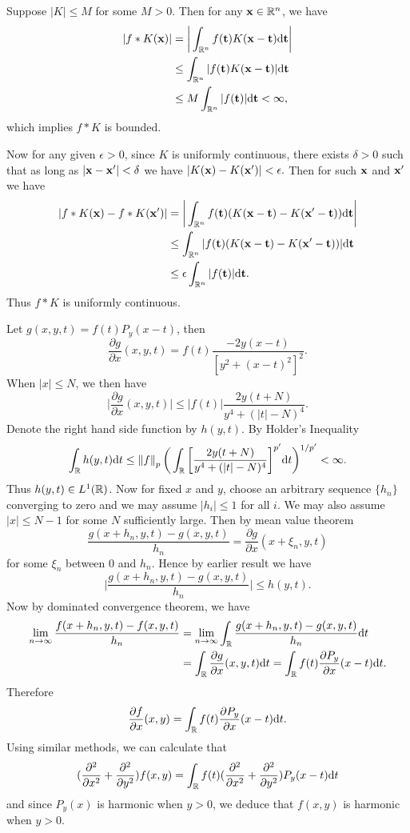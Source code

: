 \begin{exercise}{9.6}
  Suppose $|K|\leq M$ for some $M>0$. Then for any $\mathbf{x}\in\mathbb{R}^n$, we have
  \begin{align*}
      |f*K(\mathbf{x})|&=\bigg|\int_{\mathbb{R}^n}f(\mathbf{t})K(\mathbf{x}-\mathbf{t})\mathrm{d}\mathbf{t}\bigg|\\
      &\leq\int_{\mathbb{R}^n}|f(\mathbf{t})K(\mathbf{x}-\mathbf{t})|\mathrm{d}\mathbf{t}\\
      &\leq M\int_{\mathbb{R}^n}|f(\mathbf{t})|\mathrm{d}\mathbf{t}<\infty,
  \end{align*}
  which implies $f*K$ is bounded.
  
  Now for any given $\epsilon>0$, since $K$ is uniformly continuous, there exists $\delta>0$ such that as long as $|\mathbf{x}-\mathbf{x}'|<\delta$ we have $|K(\mathbf{x})-K(\mathbf{x}')|<\epsilon.$ Then for such $\mathbf{x}$ and $\mathbf{x}'$ we have
  \begin{align*}
      |f*K(\mathbf{x})-f*K(\mathbf{x}')|&=\bigg|\int_{\mathbb{R}^n}f(\mathbf{t})(K(\mathbf{x}-\mathbf{t})-K(\mathbf{x}'-\mathbf{t}))\mathrm{d}\mathbf{t}\bigg|\\
      &\leq \int_{\mathbb{R}^n}|f(\mathbf{t})(K(\mathbf{x}-\mathbf{t})-K(\mathbf{x}'-\mathbf{t}))|\mathrm{d}\mathbf{t}\\
      &\leq \epsilon\int_{\mathbb{R}^n}|f(\mathbf{t})|\mathrm{d}\mathbf{t}.
  \end{align*}
  Thus $f*K$ is uniformly continuous.
\end{exercise}

\begin{exercise}{9.7}
  Let $g(x,y,t)=f(t)P_y(x-t)$, then 
  \[
  \frac{\partial g}{\partial x}(x,y,t)=f(t)\frac{-2y(x-t)}{[y^2+(x-t)^2]^2}.
  \]
  When $|x|\leq N$, we then have 
  \[
    \bigg|\frac{\partial g}{\partial x}(x,y,t)\bigg|\leq |f(t)|\frac{2y(t+N)}{y^4+(|t|-N)^4}.
  \]
  Denote the right hand side function by $h(y,t)$. By Holder's Inequality
  \[
    \int_{\mathbb{R}} h(y,t)\mathrm{d} t\leq \left\|f\right\|_p\bigg(\int_{\mathbb{R}}\bigg[\frac{2y(t+N)}{y^4+(|t|-N)^4}\bigg]^{p'}\mathrm{d} t\bigg)^{1/{p'}}<\infty.
  \]
  Thus $h(y,t)\in L^1(\mathbb{R})$. Now for fixed $x$ and $y$, choose an arbitrary sequence $\{h_n\}$ converging to zero and we may assume $|h_i|\leq 1$ for all $i$. We may also assume $|x|\leq N-1$ for some $N$ sufficiently large. Then by mean value theorem
  \[
    \frac{g(x+h_n,y,t)-g(x,y,t)}{h_n}=\frac{\partial g}{\partial x}(x+\xi_n,y,t)
  \]
  for some $\xi_n$ between 0 and $h_n$. Hence by earlier result we have
  \[
    \bigg|\frac{g(x+h_n,y,t)-g(x,y,t)}{h_n}\bigg|\leq h(y,t).
  \]
  Now by dominated convergence theorem, we have
  \begin{align*}
      \lim_{n\rightarrow\infty}\frac{f(x+h_n,y,t)-f(x,y,t)}{h_n}&=\lim_{n\rightarrow\infty}\int_{\mathbb{R}}\frac{g(x+h_n,y,t)-g(x,y,t)}{h_n}\mathrm{d} t\\
      &=\int_{\mathbb{R}} \frac{\partial g}{\partial x}(x,y,t)\mathrm{d} t=\int_{\mathbb{R}} f(t)\frac{\partial P_y}{\partial x}(x-t)\mathrm{d} t.
  \end{align*}
  Therefore
  \[
    \frac{\partial f}{\partial x}(x,y)=\int_{\mathbb{R}} f(t)\frac{\partial P_y}{\partial x}(x-t)\mathrm{d} t.
  \]
  Using similar methods, we can calculate that 
  \[
    (\frac{\partial^2}{\partial x^2}+\frac{\partial^2}{\partial y^2})f(x,y)=\int_{\mathbb{R}} f(t)(\frac{\partial^2}{\partial x^2}+\frac{\partial^2}{\partial y^2})P_y(x-t)\mathrm{d} t
  \]
  and since $P_y(x)$ is harmonic when $y>0$, we deduce that $f(x,y)$ is harmonic when $y>0.$
\end{exercise}


